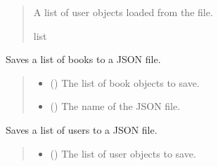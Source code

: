 \documentclass[letterpaper,10pt,english,openany,oneside]{sphinxmanual}
\begin{document}
\begin{fulllineitems}
\begin{fulllineitems}
\begin{quote}
\begin{description}
\sphinxAtStartPar
A list of user objects loaded from the file.

\sphinxAtStartPar
list

\end{description}\end{quote}

\end{fulllineitems}


\begin{fulllineitems}
\label{\detokenize{storage:storage.Storage.save_books}}
\pysigstartsignatures
{}
\pysigstopsignatures
\sphinxAtStartPar
Saves a list of books to a JSON file.
\begin{quote}\begin{description}
\begin{itemize}
\item {} 
\sphinxAtStartPar
{} () \textendash{} The list of book objects to save.

\item {} 
\sphinxAtStartPar
{} () \textendash{} The name of the JSON file.

\end{itemize}

\end{description}\end{quote}

\end{fulllineitems}


\begin{fulllineitems}
\label{\detokenize{storage:storage.Storage.save_users}}
\pysigstartsignatures
{}
\pysigstopsignatures
\sphinxAtStartPar
Saves a list of users to a JSON file.
\begin{quote}\begin{description}
\begin{itemize}
\item {} 
\sphinxAtStartPar
{} () \textendash{} The list of user objects to save.


\end{itemize}
\end{description}
\end{quote}
\end{fulllineitems}
\end{fulllineitems}
\end{document}
